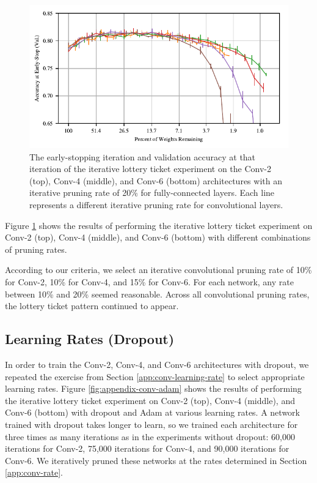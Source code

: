 \begin{figure}
\includegraphics[width=.5\textwidth]{graphs/cifar10/conv/conv_rate_sweep3/accuracy}
\caption{The early-stopping iteration and validation accuracy at that iteration  of the iterative lottery ticket experiment on the Conv-2 (top), Conv-4 (middle),
and Conv-6 (bottom) architectures with an iterative pruning rate of 20\% for fully-connected layers. Each line represents a different iterative
pruning rate for convolutional layers.}
\label{fig:appendix-conv-rates}
\end{figure}

Figure \ref{fig:appendix-conv-rates} shows the results of performing the iterative lottery ticket experiment on Conv-2 (top), Conv-4 (middle), and Conv-6 (bottom)
with different combinations of pruning rates.

According to our criteria, we select an iterative convolutional pruning rate of 10\% for Conv-2, 10\% for Conv-4, and 15\% for Conv-6.
For each network, any rate between 10\% and 20\% seemed reasonable. Across
all convolutional pruning rates, the lottery ticket pattern continued to appear.

\subsection{Learning Rates (Dropout)}
\label{app:dropout}

In order to train the Conv-2, Conv-4, and Conv-6 architectures with dropout, we repeated the exercise from Section 
\ref{app:conv-learning-rate} to select appropriate learning rates.
Figure \ref{fig:appendix-conv-adam} shows the results of performing the iterative lottery ticket experiment on
Conv-2 (top), Conv-4 (middle), and Conv-6 (bottom) with dropout and Adam at various learning rates.
A network trained with dropout takes longer to learn, so we trained each
architecture for three times as many iterations as in the experiments without dropout: 60,000 iterations for Conv-2, 75,000 iterations for Conv-4, and 90,000
iterations for Conv-6. We iteratively pruned these networks at the rates determined in Section \ref{app:conv-rate}.

